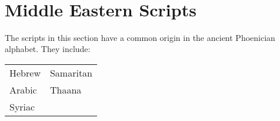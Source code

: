 ^^A
^^A
^^A
^^A
^^A
^^A
^^A
^^A
^^A
^^A
^^A
^^A
^^A



\section{Middle Eastern Scripts}

The scripts in this section have a common origin in the ancient Phoenician alphabet. They include:

\begin{center}
\begin{tabular}{ll}
Hebrew & Samaritan\\
Arabic & Thaana\\
Syriac &\\
\end{tabular}
\end{center}









